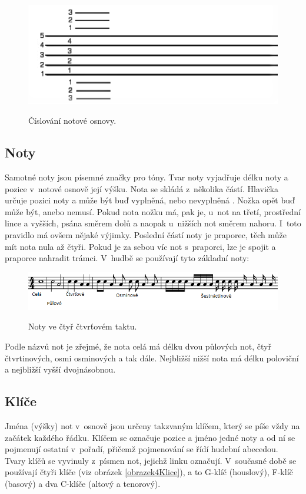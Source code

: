 \begin{figure}[h]\centering
    \centering
    \includegraphics[width=0.4\linewidth]{obrazky/notovaOsnova.png}\\[1pt]  
    \caption{Číslování notové osnovy.}    
    \label{obrazekNotovaOsnova}
\end{figure}

\subsection{Noty}
Samotné noty jsou písemné značky pro tóny.
Tvar noty vyjadřuje délku noty a pozice v~notové osnově její výšku.
Nota se skládá z~několika částí.
Hlavička určuje pozici noty a může být buď vyplněná, nebo nevyplněná . 
Nožka opět buď může být, anebo nemusí. 
Pokud nota nožku má, pak je, u~not na třetí, prostřední lince a vyšších, psána směrem dolů a naopak u~nižších not směrem nahoru.
I~toto pravidlo má ovšem nějaké výjimky.
Poslední částí noty je praporec, těch může mít nota nula až čtyři.
Pokud je za sebou víc not s~praporci, lze je spojit a praporce nahradit trámci.
V~hudbě se používají tyto základní noty:

\begin{figure}[h]\centering
    \centering
    \includegraphics[width=0.8\linewidth]{obrazky/druhyNot.png}\\[1pt]  
    \caption{Noty ve čtyř čtvrťovém taktu.}    
    \label{obrazekNoty}
\end{figure}

Podle názvů not je zřejmé, že nota celá má délku dvou půlových not, 
čtyř čtvrtinových, osmi osminových a tak dále.
Nejbližší nižší nota má délku poloviční a nejbližší vyšší dvojnásobnou.
\par

\subsection{Klíče}
Jména (výšky) not v~osnově jsou určeny takzvaným klíčem, 
který se píše vždy na začátek každého řádku.
Klíčem se označuje pozice a jméno jedné noty 
a od ní se pojmenují ostatní v~pořadí, 
přičemž pojmenování se řídí hudební abecedou.
Tvary klíčů se vyvinuly z~písmen not, jejichž linku označují.
V~současné době se používají čtyři klíče (viz obrázek \ref{obrazek4Klice}), 
a to G-klíč (houslový), F-klíč (basový) a dva C-klíče (altový a tenorový).

